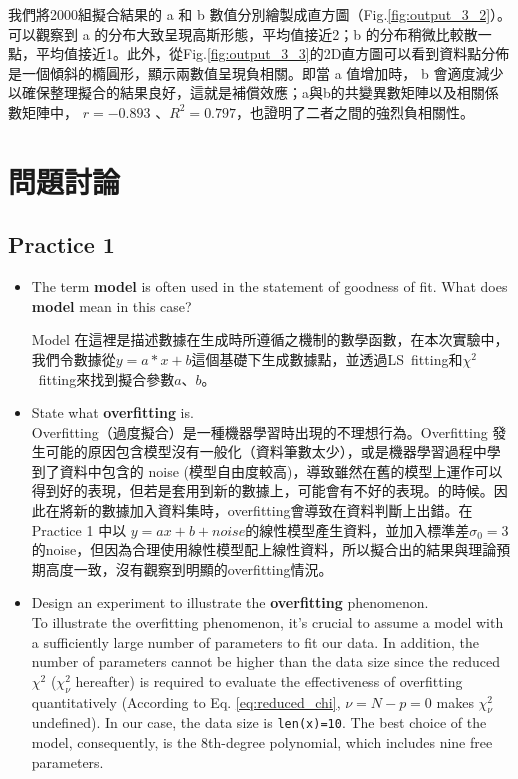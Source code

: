 \documentclass[12pt,a4paper]{article}
\begin{document}
\begin{CJK}{UTF8}{bkai}
我們將2000組擬合結果的 a 和 b 數值分別繪製成直方圖（Fig.\ref{fig:output_3_2}）。可以觀察到 a 的分布大致呈現高斯形態，平均值接近2；b 的分布稍微比較散一點，平均值接近1。此外，從Fig.\ref{fig:output_3_3}的2D直方圖可以看到資料點分佈是一個傾斜的橢圓形，顯示兩數值呈現負相關。即當 a 值增加時， b 會適度減少以確保整理擬合的結果良好，這就是補償效應；a與b的共變異數矩陣以及相關係數矩陣中， $r=-0.893$ 、$R^2=0.797$，也證明了二者之間的強烈負相關性。


\section{問題討論}
\subsection{Practice 1}\label{subsec:discuss_1}
\hfill

\begin{itemize}
    \item The term \textbf{model} is often used in the statement of goodness of fit. What does \textbf{model} mean in this case?
    \hfill

    Model 在這裡是描述數據在生成時所遵循之機制的數學函數，在本次實驗中，我們令數據從$y=a*x+b$這個基礎下生成數據點，並透過LS\ fitting和$\chi^2$\ fitting來找到擬合參數$a$、$b$。
    
    \item State what \textbf{overfitting} is.\\
    Overfitting（過度擬合）是一種機器學習時出現的不理想行為。Overfitting 發生可能的原因包含模型沒有一般化（資料筆數太少），或是機器學習過程中學到了資料中包含的 noise (模型自由度較高)，導致雖然在舊的模型上運作可以得到好的表現，但若是套用到新的數據上，可能會有不好的表現。的時候。因此在將新的數據加入資料集時，overfitting會導致在資料判斷上出錯。在 Practice 1 中以 $y=ax+b+noise$的線性模型產生資料，並加入標準差$σ_0=3$的noise，但因為合理使用線性模型配上線性資料，所以擬合出的結果與理論預期高度一致，沒有觀察到明顯的overfitting情況。

    \item Design an experiment to illustrate the \textbf{overfitting} phenomenon.\\
    To illustrate the overfitting phenomenon, it's crucial to assume a model with a sufficiently large number of parameters to fit our data. In addition, the number of parameters cannot be higher than the data size since the reduced $\chi^2$ ($\chi^2_\nu$ hereafter) is required to evaluate the effectiveness of overfitting quantitatively (According to Eq. \ref{eq:reduced_chi}, $\nu=N-p=0$ makes $\chi^2_\nu$ undefined). In our case, the data size is \texttt{len(x)=10}. The best choice of the model, consequently, is the 8th-degree polynomial, which includes nine free parameters.
    

\end{itemize}
\end{CJK}
\end{document}

